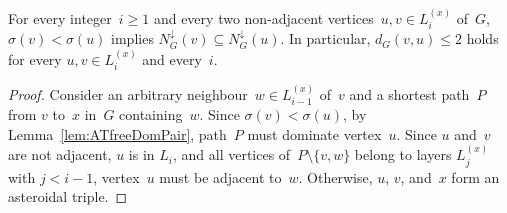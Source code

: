 \begin{lemma}
    \label{lem:ATfreeDownNeigh}
For every integer~\( i \geq 1 \) and every two non-adjacent vertices~\( u, v \in L_i^{(x)} \) of~\( G \), \( \sigma(v) < \sigma(u) \) implies \( N_G^{\downarrow}(v) \subseteq N_G^{\downarrow}(u) \).
In particular, \( d_G(v, u) \leq 2 \) holds for every \( u, v \in L_i^{(x)} \) and every~\( i \).
\end{lemma}

\begin{proof}
Consider an arbitrary neighbour~$w \in L_{i-1}^{(x)}$ of~$v$ and a shortest path~$P$ from $v$ to~$x$ in~$G$ containing~$w$.
Since $\sigma(v) < \sigma(u)$, by Lemma~\ref{lem:ATfreeDomPair}, path~$P$ must dominate vertex~$u$.
Since $u$ and~$v$ are not adjacent, $u$ is in $L_i$, and all vertices of~$P \setminus \{ v, w \}$ belong to layers $L_j^{(x)}$ with $j < i - 1$, vertex~$u$ must be adjacent to~$w$.
Otherwise, $u$, $v$, and~$x$ form an asteroidal triple.
\end{proof}

